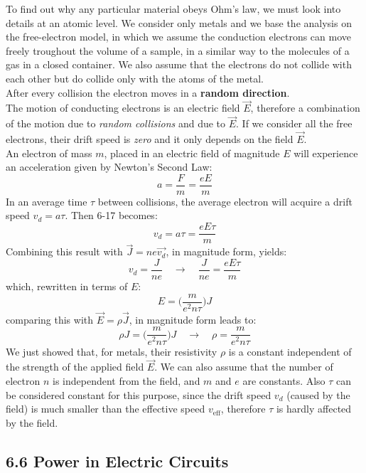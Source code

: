 \documentclass[12pt, a4paper]{article}
\begin{document}
		To find out why any particular material obeys Ohm's law, we must look into details at an atomic level. We consider only metals and we base the analysis on the free-electron model, in which we assume the conduction electrons can move freely troughout the volume of a sample, in a similar way to the molecules of a gas in a closed container. We also assume that the electrons do not collide with each other but do collide only with the atoms of the metal. \\
		After every collision the electron moves in a \textbf{random direction}. \\
		The motion of conducting electrons is an electric field $\vec{E}$, therefore a combination of the motion due to \textit{random collisions} and due to $\vec{E}$. If we consider all the free electrons, their drift speed is \textit{zero} and it only depends on the field $\vec{E}$.
		\\ 
		An electron of mass $m$, placed in an electric field of magnitude $E$ will experience an acceleration given by Newton's Second Law:
		\[
			a = \frac{F}{m} = \frac{eE}{m}
			\tag{6-17}
		\]
		In an average time $\tau$ between collisions, the average electron will acquire a drift speed $v_d = a \tau$. Then 6-17 becomes:
		\[
			v_d = a \tau = \frac{e E \tau}{m}
			\tag{6-18}			
		\]
		Combining this result with $\vec{J} = n e \vec{v_d}$, in magnitude form, yields:
		\[
			v_d = \frac{J}{n e} \quad \rightarrow \quad \frac{J}{n e} = \frac{e E \tau}{m}
			\tag{6-19}
		\]
		which, rewritten in terms of $E$:
		\[
			E = \biggl( \frac{m}{e^2 n \tau} \biggl) J
			\tag{6-20}
		\]
		comparing this with $\vec{E} = \rho \vec{J}$, in magnitude form leads to:
		\[
			\rho J = \biggl( \frac{m}{e^2 n \tau} \biggl) J \quad
			\rightarrow \quad \rho = \frac{m}{e^2 n \tau}
			\tag{6-21}
		\]
		We just showed that, for metals, their resistivity $\rho$ is a constant independent of the strength of the applied field $\vec{E}$. We can also assume that the number of electron $n$ is independent from the field, and $m$ and $e$ are constants. Also $\tau$ can be considered constant for this purpose, since the drift speed $v_d$ (caused by the field) is much smaller than the effective speed $v_{\text{eff}}$, therefore $\tau$ is hardly affected by the field. 
		
		
		
		\subsection*{6.6 Power in Electric Circuits}
		
		
		
		
		
		
		
		
		
		
		
		

	
\end{document}
